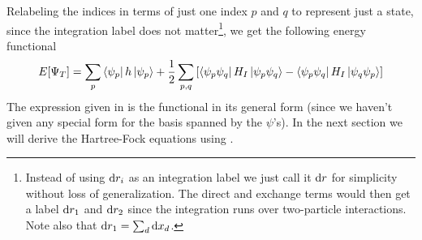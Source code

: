         Relabeling the indices in terms of just one index $p$ and $q$ to
        represent just a state, since the integration label does not
        matter\footnote{Instead of using $\mathrm{d} r_i$ as an integration label we
        just call it $\mathrm{d} r$ for simplicity without loss of generalization. The
        direct and exchange terms would then get a label $\mathrm{d} r_1$ and $\mathrm{d}
        r_2$ since the integration runs over two-particle interactions. Note
        also that $\mathrm{d} r_1=\sum_d\mathrm{d} x_d$.},
        we get the following energy functional
            \begin{equation}
                E[\Psi_T] = \sum_p\bra{\psi_p}h\ket{\psi_p} +
                \frac{1}{2}\sum_{p,q} \left[\bra{\psi_{p}\psi_{q}}H_I\ket{\psi_{p}\psi_{q}} - \bra{\psi_{p}\psi_{q}}H_I\ket{\psi_{q}\psi_{p}}\right]
                \label{eq:EfuncFinal}
            \end{equation}
        The expression given in  is the functional in its
        general form (since we haven't given any special form for the basis
        spanned by the $\psi$'s). In the next section we will derive the
        Hartree-Fock equations using .

